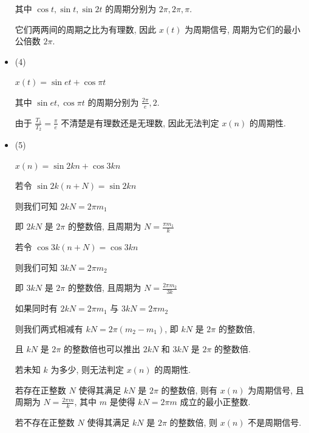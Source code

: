 \documentclass[a4paper,UTF8]{article}
\numberwithin{equation}{section}
\begin{document}
\begin{framed}
\begin{spacing}{1.5}
\begin{itemize}
      其中 $\cos t, \sin t, \sin 2t$ 的周期分别为 $2\pi, 2\pi, \pi$.
      
      它们两两间的周期之比为有理数, 因此 $x(t)$ 为周期信号, 周期为它们的最小公倍数 $\displaystyle 2\pi$.
      
      \item (4)
      
      $x(t) = \sin et + \cos \pi t$

      其中 $\sin et, \cos \pi t$ 的周期分别为 $\displaystyle \frac{2\pi}{e}, 2$.
      
      由于 $\displaystyle \frac{T_1}{T_2} = \frac{\pi}{e}$ 不清楚是有理数还是无理数, 因此无法判定 $x(n)$ 的周期性.
      
      \item (5)
      
      $x(n) = \sin 2kn + \cos 3kn$

      若令 $\sin 2k(n+N) = \sin 2kn$
      
      则我们可知 $2kN = 2\pi m_1$
      
      即 $2kN$ 是 $2\pi$ 的整数倍, 且周期为 $\displaystyle N = \frac{\pi m_1}{k}$
      
      若令 $\cos 3k(n+N) = \cos 3kn$
      
      则我们可知 $3kN = 2\pi m_2$
      
      即 $3kN$ 是 $2\pi$ 的整数倍, 且周期为 $\displaystyle N = \frac{2\pi m_2}{3k}$
      
      如果同时有 $2kN = 2\pi m_1$ 与 $3kN = 2\pi m_2$
      
      则我们两式相减有 $kN = 2\pi(m_2-m_1)$, 即 $kN$ 是 $2\pi$ 的整数倍,
      
      且 $kN$ 是 $2\pi$ 的整数倍也可以推出 $2kN$ 和 $3kN$ 是 $2\pi$ 的整数倍.
      
      若未知 $k$ 为多少, 则无法判定 $x(n)$ 的周期性.
      
      若存在正整数 $N$ 使得其满足 $kN$ 是 $2\pi$ 的整数倍, 则有 $x(n)$ 为周期信号, 且周期为 $\displaystyle N = \frac{2\pi m}{k}$, 其中 $m$ 是使得 $kN=2\pi m$ 成立的最小正整数.
      
      若不存在正整数 $N$ 使得其满足 $kN$ 是 $2\pi$ 的整数倍, 则 $x(n)$ 不是周期信号.
      
    \end{itemize}
\end{spacing}
\end{framed}


\newpage
\end{document}
